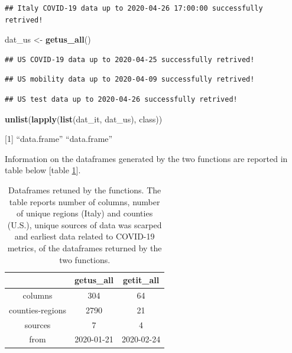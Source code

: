 \documentclass[12pt,halfline,a4paper,]{ouparticle}
\newenvironment{Shaded}{\begin{snugshade}}{\end{snugshade}}
\newcommand{\KeywordTok}[1]{\textcolor[rgb]{0.13,0.29,0.53}{\textbf{#1}}}
\newcommand{\NormalTok}[1]{#1}
\newcommand{\StringTok}[1]{\textcolor[rgb]{0.31,0.60,0.02}{#1}}
\begin{document}
\begin{verbatim}
## Italy COVID-19 data up to 2020-04-26 17:00:00 successfully retrived!
\end{verbatim}

\begin{Shaded}
\begin{Highlighting}[]
\NormalTok{dat_us <-}\StringTok{ }\KeywordTok{getus_all}\NormalTok{()}
\end{Highlighting}
\end{Shaded}

\begin{verbatim}
## US COVID-19 data up to 2020-04-25 successfully retrived!
\end{verbatim}

\begin{verbatim}
## US mobility data up to 2020-04-09 successfully retrived!
\end{verbatim}

\begin{verbatim}
## US test data up to 2020-04-26 successfully retrived!
\end{verbatim}

\begin{Shaded}
\begin{Highlighting}[]
\KeywordTok{unlist}\NormalTok{(}\KeywordTok{lapply}\NormalTok{(}\KeywordTok{list}\NormalTok{(dat_it, dat_us), class))}
\end{Highlighting}
\end{Shaded}

{[}1{]} ``data.frame'' ``data.frame''

\bigskip

Information on the dataframes generated by the two functions are
reported in table below {[}table \ref{tab:tab_dat}{]}.

\bigskip

\begin{table}[ht]
\centering
\begin{tabular}{ccc}
  \hline
 & getus\_all & getit\_all \\ 
  \hline
columns & 304 & 64 \\ 
  counties-regions & 2790 & 21 \\ 
  sources & 7 & 4 \\ 
  from & 2020-01-21 & 2020-02-24 \\ 
   \hline
\end{tabular}
\caption{Dataframes retuned by the functions.
    The table reports number of columns, number of unique regions (Italy) and counties (U.S.),
    unique sources of data was scarped and earliest data related to COVID-19 metrics, of the dataframes returned
    by the two functions.
    } 
\label{tab:tab_dat}
\end{table}
\end{document}
